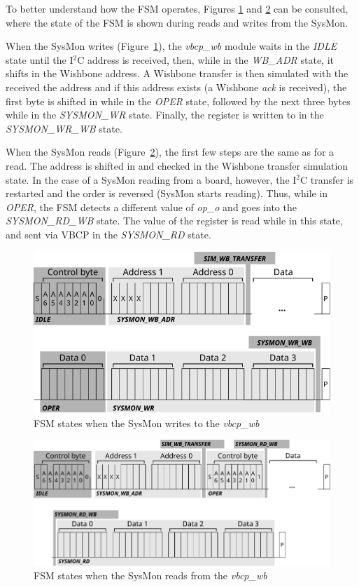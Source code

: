\documentclass[a4paper,11pt]{article}
\begin{document}
To better understand how the FSM operates, Figures \ref{fig:sysmon-wr-fsm} and
\ref{fig:sysmon-rd-fsm} can be consulted, where the state of the FSM is shown
during reads and writes from the SysMon.

When the SysMon writes (Figure~\ref{fig:sysmon-wr-fsm}), the
\textit{vbcp\_wb} module waits in the \textit{IDLE} state until
the I$^2$C address is received, then, while in the \textit{WB\_ADR} state,
it shifts in the Wishbone address. A Wishbone transfer is then simulated with
the received the address and if this address exists (a Wishbone \textit{ack}
is received), the first byte is shifted in while in the \textit{OPER} state,
followed by the next three bytes while in the \textit{SYSMON\_WR} state.
Finally, the register is written to in the \textit{SYSMON\_WR\_WB} state.

When the SysMon reads (Figure~\ref{fig:sysmon-rd-fsm}), the first few
steps are the same as for a read. The address is shifted in and
checked in the Wishbone transfer simulation state. In the case of a SysMon
reading from a board, however, the I$^2$C transfer is restarted and the order
is reversed (SysMon starts reading). Thus, while in \textit{OPER}, the FSM
detects a different value of \textit{op\_o} and goes into the
\textit{SYSMON\_RD\_WB} state. The value of the register is read while in this
state, and sent via VBCP in the \textit{SYSMON\_RD} state.

\begin{figure}[h]
  \centerline{\includegraphics[width=\textwidth]{fig/sysmon-wr-fsm}}
  \caption{FSM states when the SysMon writes to the \textit{vbcp\_wb}}
  \label{fig:sysmon-wr-fsm}
\end{figure}

\begin{figure}[h]
  \centerline{\includegraphics[width=\textwidth]{fig/sysmon-rd-fsm}}
  \caption{FSM states when the SysMon reads from the \textit{vbcp\_wb}}
  \label{fig:sysmon-rd-fsm}
\end{figure}
\end{document}
